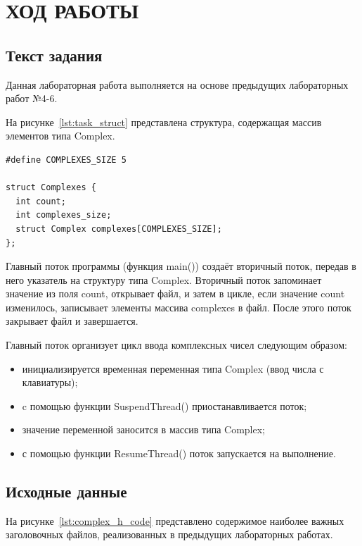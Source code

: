 \section{ХОД РАБОТЫ}

\subsection{Текст задания}

Данная лабораторная работа выполняется на основе предыдущих лабораторных работ №4-6.

На рисунке~\ref{lst:task_struct} представлена структура, содержащая массив элементов типа Complex.

\begin{lstlisting}[caption=Структура\text{,} содержащая массив элементов типа Complex,label=lst:task_struct]
#define COMPLEXES_SIZE 5

struct Complexes {
  int count;
  int complexes_size;
  struct Complex complexes[COMPLEXES_SIZE];
};
\end{lstlisting}

Главный поток программы (функция main()) создаёт вторичный поток, передав в него указатель на структуру типа Complex. Вторичный поток запоминает значение из поля count, открывает файл, и затем в цикле, если значение count изменилось, записывает элементы массива complexes в файл. После этого поток закрывает файл и завершается.

Главный поток организует цикл ввода комплексных чисел следующим образом:

\begin{itemize}
  \item инициализируется временная переменная типа Complex (ввод числа с клавиатуры);
  \item c помощью функции SuspendThread() приостанавливается поток;
  \item значение переменной заносится в массив типа Complex;
  \item с помощью функции ResumeThread() поток запускается на выполнение.
\end{itemize}

\newpage

\subsection{Исходные данные}


На рисунке~\ref{lst:complex_h_code} представлено содержимое наиболее важных заголовочных файлов, реализованных в предыдущих лабораторных работах.

